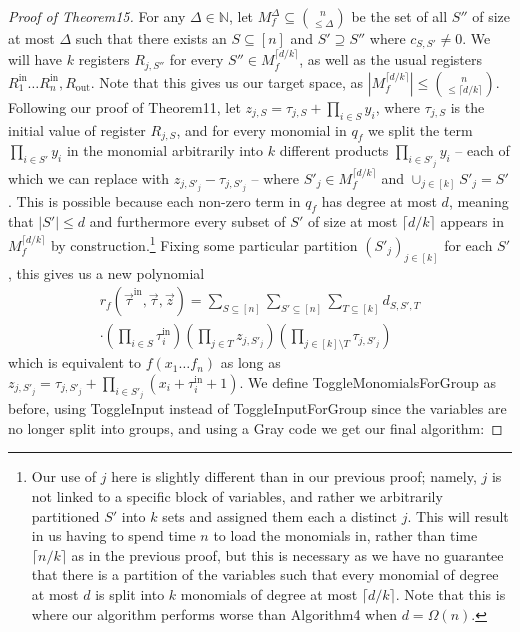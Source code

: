 \begin{proof}[Proof of Theorem15]
For any $\Delta\in\mathbb N$, let $M_f^{\Delta}\subseteq\binom n{\leq\Delta}$ be the set of all $S''$ of size at most $\Delta$ such that there exists an $S\subseteq[n]$ and $S'\supseteq S''$ where $c_{S,S'}\neq0$. We will have $k$ registers $R_{j,S''}$ for every $S''\in M_f^{\lceil d/k\rceil}$, as well as the usual registers $R_1^{\mathrm{in}}\ldots R_n^{\mathrm{in}},R_{\mathrm{out}}$. Note that this gives us our target space, as $|M_f^{\lceil d/k\rceil}|\leq\binom n{\leq\lceil d/k\rceil}$.
Following our proof of Theorem11, let $z_{j,S}=\tau_{j,S}+\prod_{i\in S}y_i$, where $\tau_{j,S}$ is the initial value of register $R_{j,S}$, and for every monomial in $q_f$ we split the term $\prod_{i\in S'}y_i$ in the monomial arbitrarily into $k$ different products $\prod_{i\in S'_j}y_i$ – each of which we can replace with $z_{j,S'_j}-\tau_{j,S'_j}$ – where $S'_j\in M_f^{\lceil d/k\rceil}$ and $\cup_{j\in[k]}S'_j=S'$. This is possible because each non-zero term in $q_f$ has degree at most $d$, meaning that $|S'|\leq d$ and furthermore every subset of $S'$ of size at most $\lceil d/k\rceil$ appears in $M_f^{\lceil d/k\rceil}$ by construction.\footnote{Our use of $j$ here is slightly different than in our previous proof; namely, $j$ is not linked to a specific block of variables, and rather we arbitrarily partitioned $S'$ into $k$ sets and assigned them each a distinct $j$. This will result in us having to spend time $n$ to load the monomials in, rather than time $\lceil n/k\rceil$ as in the previous proof, but this is necessary as we have no guarantee that there is a partition of the variables such that every monomial of degree at most $d$ is split into $k$ monomials of degree at most $\lceil d/k\rceil$. Note that this is where our algorithm performs worse than Algorithm4 when $d=\Omega(n)$.}
Fixing some particular partition $(S'_j)_{j\in[k]}$ for each $S'$, this gives us a new polynomial
\begin{multline*}
r_f(\vec\tau^{\mathrm{in}},\vec\tau,\vec z)=\sum_{S\subseteq[n]}\sum_{S'\subseteq[n]}\sum_{T\subseteq[k]}d_{S,S',T}\\
\cdot\left(\prod_{i\in S}\tau_i^{\mathrm{in}}\right)\left(\prod_{j\in T}z_{j,S'_j}\right)\left(\prod_{j\in[k]\setminus T}\tau_{j,S'_j}\right)
\end{multline*}
which is equivalent to $f(x_1\ldots f_n)$ as long as $z_{j,S'_j}=\tau_{j,S'_j}+\prod_{i\in S'_j}(x_i+\tau_i^{\mathrm{in}}+1)$. We define ToggleMonomialsForGroup as before, using ToggleInput instead of ToggleInputForGroup since the variables are no longer split into groups, and using a Gray code we get our final algorithm:

\end{proof}
